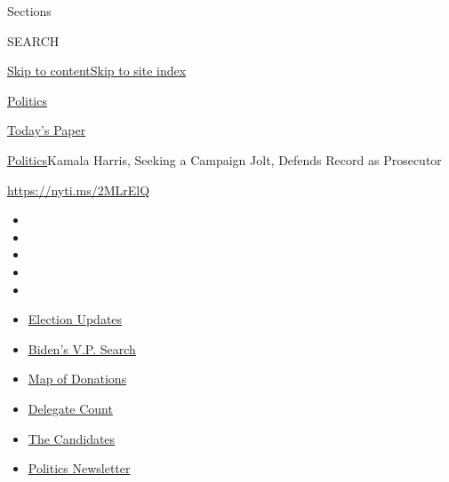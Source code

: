 Sections

SEARCH

\protect\hyperlink{site-content}{Skip to
content}\protect\hyperlink{site-index}{Skip to site index}

\href{https://www.nytimes3xbfgragh.onion/section/politics}{Politics}

\href{https://myaccount.nytimes3xbfgragh.onion/auth/login?response_type=cookie\&client_id=vi}{}

\href{https://www.nytimes3xbfgragh.onion/section/todayspaper}{Today's
Paper}

\href{/section/politics}{Politics}\textbar{}Kamala Harris, Seeking a
Campaign Jolt, Defends Record as Prosecutor

\url{https://nyti.ms/2MLrElQ}

\begin{itemize}
\item
\item
\item
\item
\item
\end{itemize}

\begin{itemize}
\item
  \href{https://www.nytimes3xbfgragh.onion/2020/08/03/us/elections/biden-vs-trump.html?action=click\&pgtype=Article\&state=default\&region=TOP_BANNER\&context=storylines_menu}{Election
  Updates}
\item
  \href{https://www.nytimes3xbfgragh.onion/article/biden-vice-president-2020.html?action=click\&pgtype=Article\&state=default\&region=TOP_BANNER\&context=storylines_menu}{Biden's
  V.P. Search}
\item
  \href{https://www.nytimes3xbfgragh.onion/interactive/2020/07/24/us/politics/trump-biden-campaign-donors.html?action=click\&pgtype=Article\&state=default\&region=TOP_BANNER\&context=storylines_menu}{Map
  of Donations}
\item
  \href{https://www.nytimes3xbfgragh.onion/interactive/2020/us/elections/delegate-count-primary-results.html?action=click\&pgtype=Article\&state=default\&region=TOP_BANNER\&context=storylines_menu}{Delegate
  Count}
\item
  \href{https://www.nytimes3xbfgragh.onion/interactive/2019/us/politics/2020-presidential-candidates.html?action=click\&pgtype=Article\&state=default\&region=TOP_BANNER\&context=storylines_menu}{The
  Candidates}
\item
  \href{https://www.nytimes3xbfgragh.onion/newsletters/politics?action=click\&pgtype=Article\&state=default\&region=TOP_BANNER\&context=storylines_menu}{Politics
  Newsletter}
\end{itemize}

